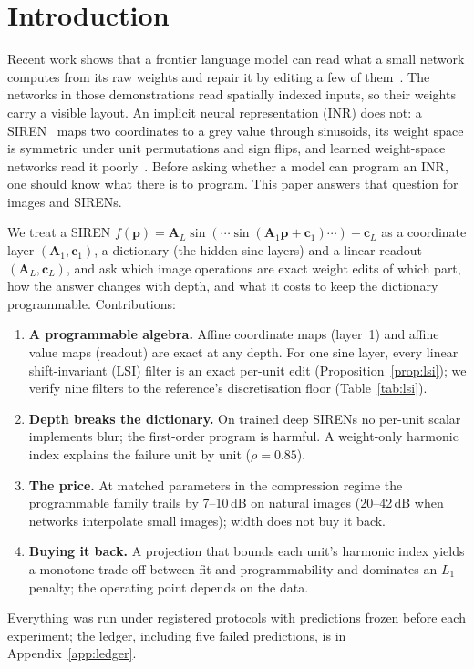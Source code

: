 \documentclass[11pt]{article}
\begin{document}
\section{Introduction}
Recent work shows that a frontier language model can read what a small network computes from its raw weights and repair it by editing a few of them~\citep{takehi2026sparks}. The networks in those demonstrations read spatially indexed inputs, so their weights carry a visible layout. An implicit neural representation (INR) does not: a SIREN~\citep{sitzmann2020siren} maps two coordinates to a grey value through sinusoids, its weight space is symmetric under unit permutations and sign flips, and learned weight-space networks read it poorly~\citep{zhou2023nfn,kofinas2025internal}. Before asking whether a model can program an INR, one should know what there is to program. This paper answers that question for images and SIRENs.

We treat a SIREN $f(\mathbf p)=\mathbf A_L\sin(\cdots\sin(\mathbf A_1\mathbf p+\mathbf c_1)\cdots)+\mathbf c_L$ as a coordinate layer $(\mathbf A_1,\mathbf c_1)$, a dictionary (the hidden sine layers) and a linear readout $(\mathbf A_L,\mathbf c_L)$, and ask which image operations are exact weight edits of which part, how the answer changes with depth, and what it costs to keep the dictionary programmable. Contributions:
\begin{enumerate}
\item \textbf{A programmable algebra.} Affine coordinate maps (layer~1) and affine value maps (readout) are exact at any depth. For one sine layer, every linear shift-invariant (LSI) filter is an exact per-unit edit (Proposition~\ref{prop:lsi}); we verify nine filters to the reference's discretisation floor (Table~\ref{tab:lsi}).
\item \textbf{Depth breaks the dictionary.} On trained deep SIRENs no per-unit scalar implements blur; the first-order program is harmful. A weight-only harmonic index explains the failure unit by unit ($\rho=0.85$).
\item \textbf{The price.} At matched parameters in the compression regime the programmable family trails by 7--10\,dB on natural images (20--42\,dB when networks interpolate small images); width does not buy it back.
\item \textbf{Buying it back.} A projection that bounds each unit's harmonic index yields a monotone trade-off between fit and programmability and dominates an $L_1$ penalty; the operating point depends on the data.
\end{enumerate}
Everything was run under registered protocols with predictions frozen before each experiment; the ledger, including five failed predictions, is in Appendix~\ref{app:ledger}.
\end{document}
